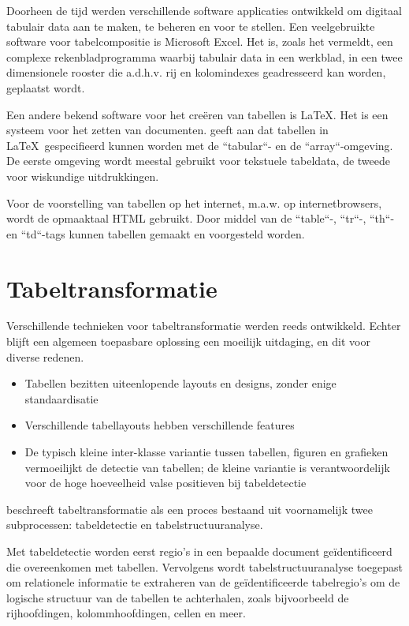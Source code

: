 Doorheen de tijd werden verschillende software applicaties ontwikkeld om digitaal tabulair data aan te maken, te beheren en voor te stellen. Een veelgebruikte software voor tabelcompositie is Microsoft Excel. Het is, zoals \textcite{Wang1996} het vermeldt, een complexe rekenbladprogramma waarbij tabulair data in een werkblad, in een twee dimensionele rooster die a.d.h.v. rij en kolomindexes geadresseerd kan worden, geplaatst wordt.

Een andere bekend software voor het creëren van tabellen is \LaTeX. Het is een systeem voor het zetten van documenten. \textcite{Wang1996} geeft aan dat tabellen in \LaTeX\ gespecifieerd kunnen worden met de ``tabular``- en de ``array``-omgeving. De eerste omgeving wordt meestal gebruikt voor tekstuele tabeldata, de tweede voor wiskundige uitdrukkingen.

Voor de voorstelling van tabellen op het internet, m.a.w. op internetbrowsers, wordt de opmaaktaal HTML gebruikt. Door middel van de ``table``-, ``tr``-, ``th``- en ``td``-tags kunnen tabellen gemaakt en voorgesteld worden.

\section{Tabeltransformatie}
\label{sec:tabel-transformatie}

Verschillende technieken voor tabeltransformatie werden reeds ontwikkeld. Echter blijft een algemeen toepasbare oplossing een moeilijk uitdaging, en dit voor diverse redenen.

\begin{itemize}
    \item Tabellen bezitten uiteenlopende layouts en designs, zonder enige standaardisatie
          \autocite{Kasar2014}
    \item Verschillende tabellayouts hebben verschillende features \autocite{Kasar2014}
    \item De typisch kleine inter-klasse variantie tussen tabellen, figuren en grafieken vermoeilijkt
          de detectie van tabellen; de kleine variantie is verantwoordelijk voor de hoge hoeveelheid
          valse positieven bij tabeldetectie \autocite{Embley2006}
  \end{itemize}

\textcite{Kasar2014} beschreeft tabeltransformatie als een proces bestaand uit voornamelijk twee subprocessen: tabeldetectie en tabelstructuuranalyse. 

Met tabeldetectie worden eerst regio's in een bepaalde document geïdentificeerd die overeenkomen met tabellen. Vervolgens wordt tabelstructuuranalyse toegepast om relationele informatie te extraheren van de geïdentificeerde tabelregio's om de logische structuur van de tabellen te achterhalen, zoals bijvoorbeeld de rijhoofdingen, kolommhoofdingen, cellen en meer.

